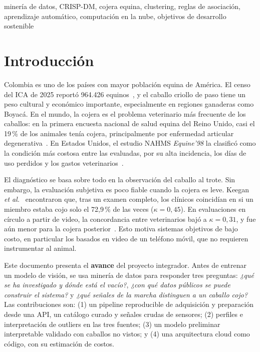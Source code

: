 \documentclass[conference,a4paper]{IEEEtran}
\begin{document}
\begin{IEEEkeywords}
minería de datos, CRISP-DM, cojera equina, clustering, reglas de asociación, aprendizaje automático, computación en la nube, objetivos de desarrollo sostenible
\end{IEEEkeywords}

\section{Introducción}
Colombia es uno de los países con mayor población equina de América. El censo del ICA de 2025 reportó 964.426 equinos~\cite{agronegocios2025censo}, y el caballo criollo de paso tiene un peso cultural y económico importante, especialmente en regiones ganaderas como Boyacá. En el mundo, la cojera es el problema veterinario más frecuente de los caballos: en la primera encuesta nacional de salud equina del Reino Unido, casi el 19\,\% de los animales tenía cojera, principalmente por enfermedad articular degenerativa~\cite{nehs2013}. En Estados Unidos, el estudio NAHMS \emph{Equine'98} la clasificó como la condición más costosa entre las evaluadas, por su alta incidencia, los días de uso perdidos y los gastos veterinarios~\cite{usda1998}.

El diagnóstico se basa sobre todo en la observación del caballo al trote. Sin embargo, la evaluación subjetiva es poco fiable cuando la cojera es leve. Keegan \emph{et al.}~\cite{keegan2010} encontraron que, tras un examen completo, los clínicos coincidían en si un miembro estaba cojo solo el 72,9\,\% de las veces ($\kappa=0{,}45$). En evaluaciones en círculo a partir de video, la concordancia entre veterinarios bajó a $\kappa=0{,}31$, y fue aún menor para la cojera posterior~\cite{hammarberg2016}. Esto motiva sistemas objetivos de bajo costo, en particular los basados en video de un teléfono móvil, que no requieren instrumentar al animal.

Este documento presenta el \textbf{avance} del proyecto integrador. Antes de entrenar un modelo de visión, se usa minería de datos para responder tres preguntas: \emph{¿qué se ha investigado y dónde está el vacío?}, \emph{¿con qué datos públicos se puede construir el sistema?} y \emph{¿qué señales de la marcha distinguen a un caballo cojo?} Las contribuciones son: (1) un pipeline reproducible de adquisición y preparación desde una API, un catálogo curado y señales crudas de sensores; (2) perfiles e interpretación de outliers en las tres fuentes; (3) un modelo preliminar interpretable validado con caballos no vistos; y (4) una arquitectura cloud como código, con su estimación de costos.
\end{document}

